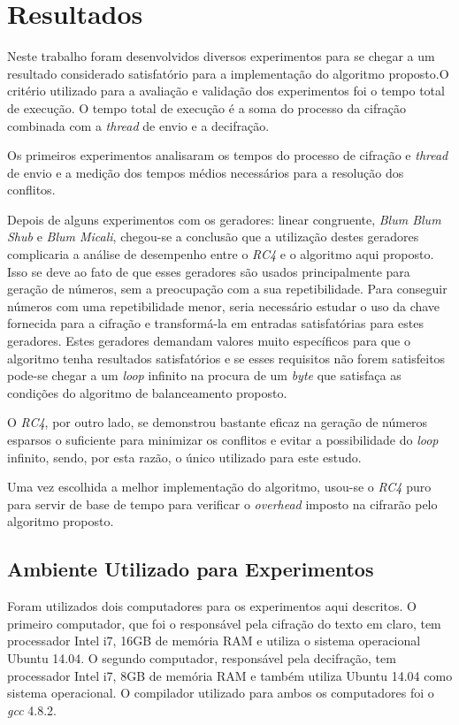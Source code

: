 \chapter{Resultados}
\label{results}

Neste trabalho foram desenvolvidos diversos experimentos para se chegar a um resultado considerado satisfatório para a implementação do algoritmo proposto.O critério utilizado para a avaliação e validação dos experimentos foi o tempo total de execução. O tempo total de execução é a soma do processo da cifração combinada com a \textit{thread} de envio e a decifração. 

Os primeiros experimentos analisaram os tempos do processo de cifração e \textit{thread} de envio e a medição dos tempos médios necessários para a resolução dos conflitos.

Depois de alguns experimentos com os geradores: linear congruente, \textit{Blum Blum Shub} e \textit{Blum Micali}, chegou-se a conclusão que a utilização destes geradores complicaria a análise de desempenho entre o \textit{RC4} e o algoritmo aqui proposto. Isso se deve ao fato de que esses geradores são usados principalmente para geração de números, sem a preocupação com a sua repetibilidade. Para conseguir números com uma repetibilidade menor, seria necessário estudar o uso da chave fornecida para a cifração e transformá-la em entradas satisfatórias para estes geradores. Estes geradores demandam valores muito específicos para que o algoritmo tenha resultados satisfatórios e se esses requisitos não forem satisfeitos pode-se chegar a um \textit{loop} infinito na procura de um \textit{byte} que satisfaça as condições do algoritmo de balanceamento proposto.

O \textit{RC4}, por outro lado, se demonstrou bastante eficaz na geração de números esparsos o suficiente para minimizar os conflitos e evitar a possibilidade do \textit{loop} infinito, sendo, por esta razão, o único utilizado para este estudo.

Uma vez escolhida a melhor implementação do algoritmo, usou-se o \textit{RC4} puro para servir de base de tempo para verificar o \textit{overhead} imposto na cifrarão pelo algoritmo proposto.


\section{Ambiente Utilizado para Experimentos}

Foram utilizados dois computadores para os experimentos aqui descritos. O primeiro computador, que foi o responsável pela cifração do texto em claro, tem processador Intel i7, 16GB de memória RAM e utiliza o sistema operacional Ubuntu 14.04. O segundo computador, responsável pela decifração, tem processador Intel i7, 8GB de memória RAM e também utiliza Ubuntu 14.04 como sistema operacional. O compilador utilizado para ambos os computadores foi o \textit{gcc} 4.8.2.


